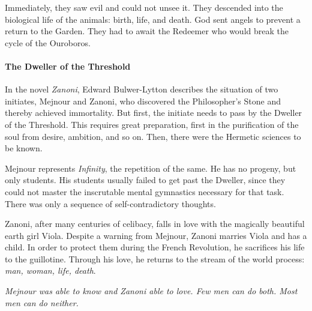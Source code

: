 Immediately, they saw evil and could not unsee it. They descended into the biological life of the animals: birth, life, and death. God sent angels to prevent a return to the Garden. They had to await the Redeemer who would break the cycle of the Ouroboros.

\paragraph{The Dweller of the Threshold}

In the novel \emph{Zanoni}, Edward Bulwer-Lytton describes the situation of two initiates, Mejnour and Zanoni, who discovered the Philosopher's Stone and thereby achieved immortality. But first, the initiate needs to pass by the Dweller of the Threshold. This requires great preparation, first in the purification of the soul from desire, ambition, and so on. Then, there were the Hermetic sciences to be known.

Mejnour represents \emph{Infinity}, the repetition of the same. He has no progeny, but only students. His students usually failed to get past the Dweller, since they could not master the inscrutable mental gymnastics necessary for that task. There was only a sequence of self-contradictory thoughts.

Zanoni, after many centuries of celibacy, falls in love with the magically beautiful earth girl Viola. Despite a warning from Mejnour, Zanoni marries Viola and has a child. In order to protect them during the French Revolution, he sacrifices his life to the guillotine. Through his love, he returns to the stream of the world process: \emph{man, woman, life, death}.

\emph{Mejnour was able to know and Zanoni able to love. Few men can do both. Most men can do neither.}

